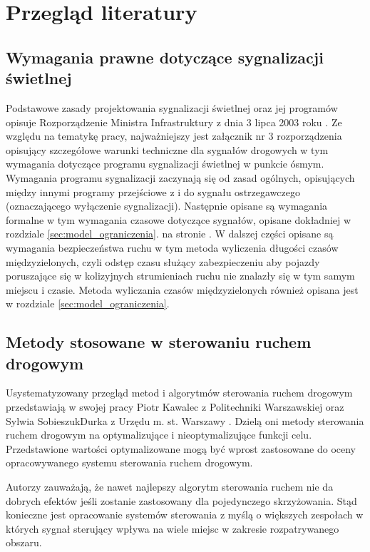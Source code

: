 \chapter{Przegląd literatury}
\section{Wymagania prawne dotyczące sygnalizacji świetlnej}
Podstawowe zasady projektowania sygnalizacji świetlnej oraz jej programów opisuje Rozporządzenie Ministra Infrastruktury z dnia 3 lipca 2003 roku \cite{rozporzadzenie}.
Ze względu na tematykę pracy, najważniejszy jest załącznik nr 3 rozporządzenia opisujący szczegółowe warunki techniczne dla sygnałów drogowych w tym wymagania dotyczące programu sygnalizacji świetlnej w punkcie ósmym.
Wymagania programu sygnalizacji zaczynają się od zasad ogólnych, opisujących między innymi programy przejściowe z i do sygnału ostrzegawczego (oznaczającego wyłączenie sygnalizacji). Następnie opisane są wymagania formalne w tym wymagania czasowe dotyczące sygnałów, opisane dokładniej w rozdziale \ref{sec:model_ograniczenia}. na stronie \pageref{sec:model_ograniczenia}.
W dalszej części opisane są wymagania bezpieczeństwa ruchu w tym metoda wyliczenia długości czasów międzyzielonych, czyli odstęp czasu służący zabezpieczeniu aby pojazdy poruszające się w kolizyjnych strumieniach ruchu nie znalazły się w tym samym miejscu i czasie. Metoda wyliczania czasów międzyzielonych również opisana jest w rozdziale \ref{sec:model_ograniczenia}.

\section{Metody stosowane w sterowaniu ruchem drogowym}
Usystematyzowany przegląd metod i algorytmów sterowania ruchem drogowym przedstawiają w swojej pracy Piotr Kawalec z Politechniki Warszawskiej oraz Sylwia Sobieszuk\-Durka z Urzędu m. st. Warszawy \cite{kawalec+sobieszuk-durka}. Dzielą oni metody sterowania ruchem drogowym na optymalizujące i nieoptymalizujące funkcji celu.
Przedstawione wartości optymalizowane mogą być wprost zastosowane do oceny opracowywanego systemu sterowania ruchem drogowym.

Autorzy zauważają, że nawet najlepszy algorytm sterowania ruchem nie da dobrych efektów jeśli zostanie zastosowany dla pojedynczego skrzyżowania. Stąd konieczne jest opracowanie systemów sterowania z myślą o większych zespołach w których sygnał sterujący wpływa na wiele miejsc w zakresie rozpatrywanego obszaru.

